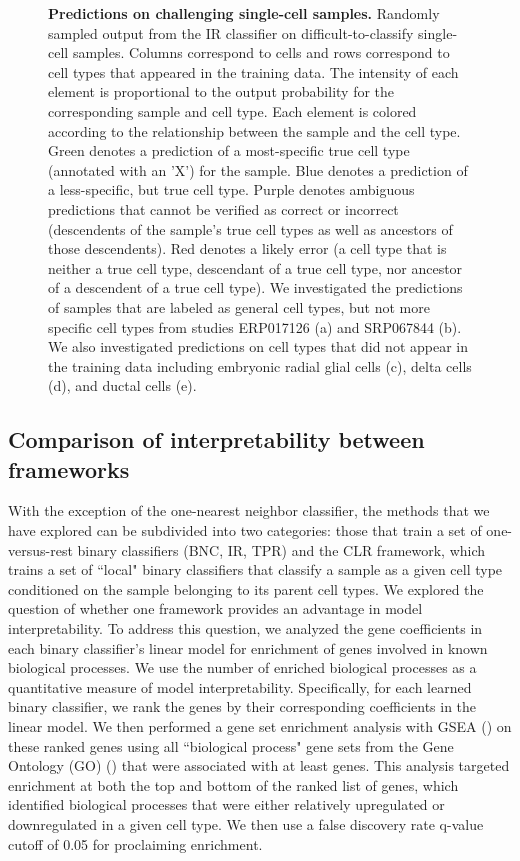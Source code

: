\begin{figure}
   \caption{\textbf{Predictions on challenging single-cell samples.} Randomly sampled output from the IR classifier on difficult-to-classify single-cell samples. Columns correspond to cells and rows correspond to cell types that appeared in the training data. The intensity of each element is proportional to the output probability for the corresponding sample and cell type. Each element is colored according to the relationship between the sample and the cell type. Green denotes a prediction of a most-specific true cell type (annotated with an 'X') for the sample. Blue denotes a prediction of a less-specific, but true cell type. Purple denotes ambiguous predictions that cannot be verified as correct or incorrect (descendents of the sample's true cell types as well as ancestors of those descendents). Red denotes a likely error (a cell type that is neither a true cell type, descendant of a true cell type, nor ancestor of a descendent of a true cell type). We investigated the predictions of samples that are labeled as general cell types, but not more specific cell types from studies ERP017126 (a) and SRP067844 (b). We also investigated predictions on cell types that did not appear in the training data including embryonic radial glial cells (c), delta cells (d), and ductal cells (e).}
    \label{fig:difficult_single_cells}
      \end{figure} 
        
  
\subsection*{Comparison of interpretability between frameworks}

With the exception of the one-nearest neighbor classifier, the methods that we have explored can be subdivided into two categories: those that train a set of one-versus-rest binary classifiers (BNC, IR, TPR) and the CLR framework, which trains a set of ``local" binary classifiers that classify a sample as a given cell type conditioned on the sample belonging to its parent cell types. We explored the question of whether one framework provides an advantage in model interpretability.  To address this question, we analyzed the gene coefficients in each binary classifier's linear model for enrichment of genes involved in known biological processes. We use the number of enriched biological processes as a quantitative measure of model interpretability.  
Specifically, for each learned binary classifier, we rank the genes by their corresponding coefficients in the linear model. We then performed a gene set enrichment analysis with GSEA (\citealp{Subramanian2005}) on these ranked genes using all  ``biological process" gene sets from the Gene Ontology (GO) (\citealp{Ashburner2000}) that were associated with at least \MinGenesInGOSet{} genes. This analysis targeted enrichment at both the top and bottom of the ranked list of genes, which identified biological processes that were either relatively upregulated or downregulated in a given cell type. We then use a false discovery rate q-value cutoff of 0.05 for proclaiming enrichment.  

